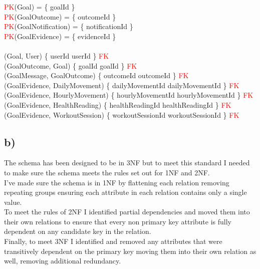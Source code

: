 \documentclass{article}
\begin{document}
\begin{zed}
\textcolor{red}{PK}(Goal) = \{ goalId \}  \\
\textcolor{red}{PK}(GoalOutcome) = \{ outcomeId \}  \\
\textcolor{red}{PK}(GoalNotification) = \{ notificationId \}  \\
\textcolor{red}{PK}(GoalEvidence) = \{ evidenceId \}  \\
\newline \\ 
(Goal, User) \mapsto \{ userId \mapsto userId \} \in \textcolor{red}{FK} \\
(GoalOutcome, Goal) \mapsto \{ goalId \mapsto goalId \} \in \textcolor{red}{FK} \\
(GoalMessage, GoalOutcome) \mapsto \{ outcomeId \mapsto outcomeId \} \in \textcolor{red}{FK} \\
(GoalEvidence, DailyMovement) \mapsto \{ dailyMovementId \mapsto dailyMovementId \} \in \textcolor{red}{FK} \\
(GoalEvidence, HourlyMovement) \mapsto \{ hourlyMovementId \mapsto hourlyMovementId \} \in \textcolor{red}{FK} \\
(GoalEvidence, HealthReading) \mapsto \{ healthReadingId \mapsto healthReadingId \} \in \textcolor{red}{FK} \\
(GoalEvidence, WorkoutSession) \mapsto \{ workoutSessionId \mapsto workoutSessionId \} \in \textcolor{red}{FK} \\
\end{zed}

\subsection*{\small b)}

The schema has been designed to be in 3NF but to meet this standard I needed to make sure the schema meets the rules set out for 1NF and 2NF. \\
\newline
I've made sure the schema is in 1NF by flattening each relation removing repeating groups ensuring each attribute in each relation contains only a single value. \\ 
\newline
To meet the rules of 2NF I identified partial dependencies and moved them into their own relations to ensure that every non primary key attribute is fully dependent on any candidate key in the relation. \\
\newline
Finally, to meet 3NF I identified and removed any attributes that were transitively dependent on the primary key moving them into their own relation as well, removing additional redundancy. 
\end{document}
